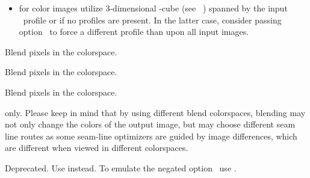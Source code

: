 \begin{codelist}
\begin{description}
\begin{itemize}
    \item
      for color images utilize 3-dimensional -cube (see
      \equationabbr~) spanned by the input ~profile
      or  if no profiles are present.  In the latter case, consider passing
      option~ to force a
      different profile than  upon all input images.
    \end{itemize}

  \item[\itempar{\code{lab} \\ \code{cielab} \\ \code{lstar} \\ \code{l-star}}]\itemend
    Blend pixels in the  colorspace.

  \item[\itempar{\code{luv} \\ \code{cieluv}}]\itemend
    Blend pixels in the  colorspace.

  \item[\itempar{\code{ciecam} \\ \code{ciecam02} \\ \code{jch}}]\itemend
    Blend pixels in the  colorspace.
  \end{description}

  \ifenblend
    \begin{restrictedmaterial}{ only.}
      Please keep in mind that by using different blend colorspaces, blending may not only
      change the colors of the output image, but  may choose different seam
      line routes as some seam-line optimizers are guided by image differences, which are
      different when viewed in different colorspaces.
    \end{restrictedmaterial}
  \fi


  \label{opt-ciecam}%
\item[\itempar{-c \\ --ciecam}]\itemend
  Deprecated.  Use  instead.  To emulate the negated
  option~ use .


\end{codelist}
